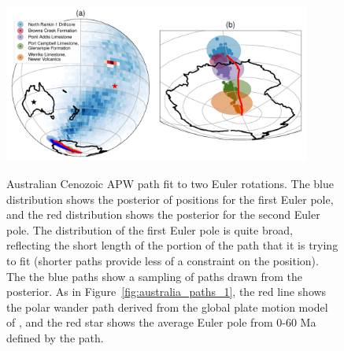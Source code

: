 \documentclass[preprint,12pt,authoryear]{elsarticle}
\begin{document}
\begin{figure}
\includegraphics[width=0.9\textwidth]{figures/australia/australia_paths_2.pdf}
\label{fig:australia_paths_2}
\caption[Australian Cenozoic APW path fit to two Euler rotations.]{Australian Cenozoic APW path fit to two Euler rotations. The blue distribution shows the posterior of positions for the first Euler pole, and the red distribution shows the posterior for the second Euler pole. The distribution of the first Euler pole is quite broad, reflecting the short length of the portion of the path that it is trying to fit (shorter paths provide less of a constraint on the position). The the blue paths show a sampling of paths drawn from the posterior. As in Figure~\ref{fig:australia_paths_1}, the red line shows the polar wander path derived from the global plate motion model of \citet{seton2012global}, and the red star shows the average Euler pole from 0-60 Ma defined by the \citet{seton2012global} path.}
\end{figure}
\end{document}
